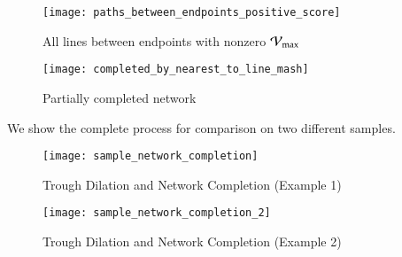 \begin{figure}
	\texttt{[image: paths\_between\_endpoints\_positive\_score]}
	\caption{All lines between endpoints with nonzero $\mathcal{V}_{\max}$}
	\label{fig:network-completion-all-pairs}
\end{figure}
\begin{figure}
	\texttt{[image: completed\_by\_nearest\_to\_line\_mash]}
	\caption{Partially completed network}
	\label{fig:network-completion-end-result}
\end{figure}

We show the complete process for comparison on two different samples. 

\begin{figure}
	\texttt{[image: sample\_network\_completion]}
	\caption{Trough Dilation and Network Completion (Example 1)}
	\label{fig:network-completion-demo-1}
\end{figure}
\begin{figure}
	\texttt{[image: sample\_network\_completion\_2]}
	\caption{Trough Dilation and Network Completion (Example 2)}
	\label{fig:network-completion-demo-2}
\end{figure}



